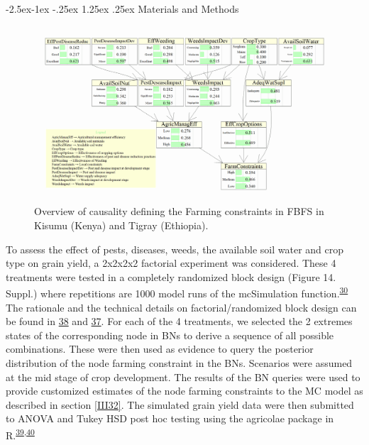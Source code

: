 \documentclass[12pt,oneside]{article}
\makeatletter
\renewcommand\paragraph{\@startsection{paragraph}{4}{\z@}%
            {-2.5ex\@plus -1ex \@minus -.25ex}%
            {1.25ex \@plus .25ex}%
            {\normalfont\normalsize\bfseries}}
\makeatother
\begin{document}
\hypertarget{IV232}{%
\paragraph{Materials and Methods}\label{IV232}}

\begin{figure}[!htbp]

{\centering \includegraphics[width=1\linewidth,]{figures/Modelling_FBFS_Farming_Constraints} 

}

\caption{Overview of causality defining the Farming constraints in FBFS in Kisumu (Kenya) and Tigray (Ethiopia).}\label{fig:fig10}
\end{figure}

To assess the effect of pests, diseases, weeds, the available soil water and crop type on grain yield, a 2x2x2x2 factorial experiment was considered. These 4 treatments were tested in a completely randomized block design (Figure 14. Suppl.) where repetitions are 1000 model runs of the mcSimulation function.\textsuperscript{\protect\hyperlink{ref-Luedeling_and_Goehring_2018}{30}} The rationale and the technical details on factorial/randomized block design can be found in \protect\hyperlink{ref-Panse_and_Sukhatme_1957}{38} and \protect\hyperlink{ref-Gomez_and_Gomez_1984}{37}. For each of the 4 treatments, we selected the 2 extremes states of the corresponding node in BNs to derive a sequence of all possible combinations. These were then used as evidence to query the posterior distribution of the node farming constraint in the BNs. Scenarios were assumed at the mid stage of crop development. The results of the BN queries were used to provide customized estimates of the node farming constraints to the MC model as described in section \ref{III32}. The simulated grain yield data were then submitted to ANOVA and Tukey HSD post hoc testing using the agricolae package in R.\textsuperscript{\protect\hyperlink{ref-DeMendiburu_2016}{39},\protect\hyperlink{ref-RCoreTeam_2018}{40}}
\end{document}
